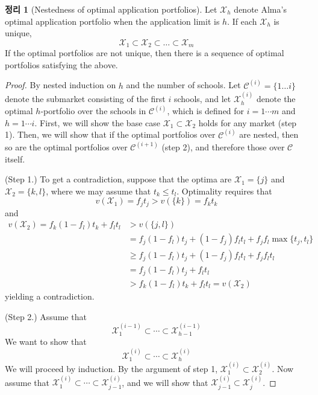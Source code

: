 \documentclass[12pt]{article} %
\newtheorem{theorem}{Theorem}
\theoremstyle{definition}
\newtheorem{theorem}{정리}
\theoremstyle{definition}
\begin{document}
\begin{theorem}[Nestedness of optimal application portfolios] \label{nestedapplication}
Let $\mathcal{X}_h$ denote Alma’s optimal application portfolio when the application limit is $h$. If each $\mathcal{X}_h$ is unique,
\begin{equation}
\mathcal{X}_1 \subset \mathcal{X}_2\subset \dots \subset \mathcal{X}_m
\end{equation}
If the optimal portfolios are not unique, then there is a sequence of optimal portfolios satisfying the above.
\end{theorem}
\begin{proof} By nested induction on $h$ and the number of schools. Let $\mathcal{C}^{(i)} = \{1 \dots i\}$ denote the submarket consisting of the first $i$ schools, and let $\mathcal{X}_h^{(i)}$ denote the optimal $h$-portfolio over the schools in $\mathcal{C}^{(i)}$, which is defined for $i = 1 \cdots m$ and $h = 1 \cdots i$. First, we will show the base case  $\mathcal{X}_1 \subset \mathcal{X}_2$ holds for any market (step 1). Then, we will show that if the optimal portfolios over $\mathcal{C}^{(i)}$ are nested, then so are the optimal portfolios over $\mathcal{C}^{(i+1)}$ (step 2), and therefore those over $\mathcal{C}$ itself. 

(Step 1.) To get a contradiction, suppose that the optima are $\mathcal{X}_1 = \{j\}$ and $\mathcal{X}_2 = \{k, l\}$, where we may assume that $t_k \leq t_l$. Optimality requires that
\begin{equation}v(\mathcal{X}_1 )  = f_j t_j > v(\{k\}) = f_k t_k\end{equation}
and
\begin{align}
v(\mathcal{X}_2) =  f_k (1- f_l) t_k + f_l t_l &> v(\{j, l\}) \\
& = f_j (1- f_l) t_j + (1- f_j) f_l t_l + f_j f_l \max\{t_j, t_l\} \\
&\geq  f_j (1- f_l) t_j + (1- f_j) f_l t_l + f_j f_l  t_l \\
&= f_j (1- f_l) t_j + f_l t_l  \\
&> f_k (1- f_l) t_k + f_l t_l  = v(\mathcal{X}_2)
\end{align}
yielding a contradiction.

(Step 2.) Assume that
\begin{equation} \label{himinusonenested}
\mathcal{X}_1^{(i-1)} \subset \cdots \subset \mathcal{X}_{h-1}^{(i-1)}
\end{equation}
We want to show that
\begin{equation} \label{hplusoneiplusonenested}
\mathcal{X}_1^{(i)} \subset \cdots \subset \mathcal{X}_{h}^{(i)}
\end{equation}
We will proceed by induction. By the argument of step 1, $\mathcal{X}_1^{(i)} \subset  \mathcal{X}_2^{(i)}$. Now assume that $\mathcal{X}_1^{(i)} \subset  \cdots \subset \mathcal{X}_{j-1}^{(i)}$, and we will show that $\mathcal{X}_{j-1}^{(i)} \subset \mathcal{X}_{j}^{(i)}$. 


\end{proof}
\end{document}
